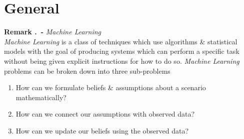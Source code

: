 \documentclass[11pt,a4paper]{article}
\begin{document}
\newcommand{\definition}[1]{\stepcounter{definition} \textbf{Definition \arabic{section}.\arabic{definition}\ - }\textit{#1}\\}
\newcommand{\definitionn}[1]{\stepcounter{definition} \textbf{Definition \arabic{section}.\arabic{definition}\ - }\textit{#1}}
\newcommand{\proof}[1]{\stepcounter{proof} \textbf{Proof \arabic{section}.\arabic{proof}\ - }\textit{#1}\\}
\newcommand{\prooff}[1]{\stepcounter{proof} \textbf{Proof \arabic{section}.\arabic{proof}\ - }\textit{#1}}
\newcommand{\example}[1]{\stepcounter{example} \textbf{Example \arabic{section}.\arabic{example}\ - }\textit{#1}\\}
\newcommand{\examplee}[1]{\stepcounter{example} \textbf{Example \arabic{section}.\arabic{example}\ - }\textit{#1}}
\newcommand{\notation}[1]{\stepcounter{notation} \textbf{Notation \arabic{section}.\arabic{notation}\ - }\textit{#1}\\}
\newcommand{\notationn}[1]{\stepcounter{notation} \textbf{Notation \arabic{section}.\arabic{notation}\ - }\textit{#1}}
\newcommand{\proposition}[1]{\stepcounter{proposition} \textbf{Proposition \arabic{section}.\arabic{proposition}\ - }\textit{#1}\\}
\newcommand{\propositionn}[1]{\stepcounter{proposition} \textbf{Proposition \arabic{section}.\arabic{proposition}\ - }\textit{#1}}
\newcommand{\remark}[1]{\stepcounter{remark} \textbf{Remark \arabic{section}.\arabic{remark}\ - }\textit{#1}\\}
\newcommand{\remarkk}[1]{\stepcounter{remark} \textbf{Remark \arabic{section}.\arabic{remark}\ - }\textit{#1}}
\newcommand{\theorem}[1]{\stepcounter{theorem} \textbf{Theorem \arabic{section}.\arabic{theorem}\ - }\textit{#1}\\}
\newcommand{\theoremm}[1]{\stepcounter{theorem} \textbf{Theorem \arabic{section}.\arabic{theorem}\ - }\textit{#1}}

\tableofcontents

\newpage

\section{General}

\remark{Machine Learning}
\textit{Machine Learning} is a class of techniques which use algorithms \& statistical models with the goal of producing systems which can perform a specific task without being given explicit instructions for how to do so. \textit{Machine Learning} problems can be broken down into three sub-problems
\begin{enumerate}
	\item How can we formulate beliefs \& assumptions about a scenario mathematically?
	\item How can we connect our assumptions with observed data?
	\item How can we update our beliefs using the observed data?
\end{enumerate}
\end{document}
